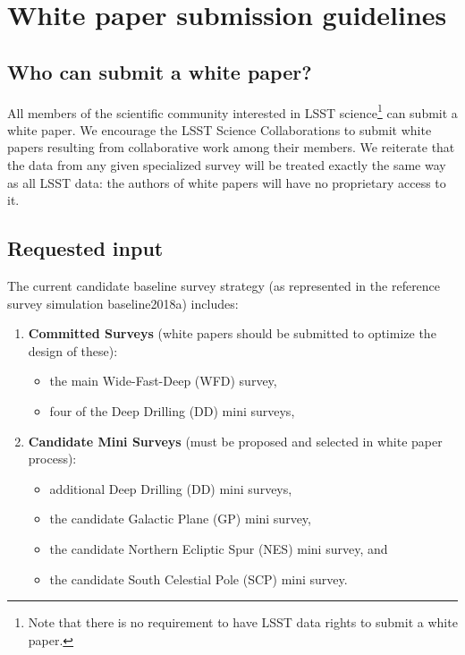\documentclass[DM,toc,usenatbib]{lsstdoc}
\begin{document}
\newpage
\section{White paper submission guidelines} \label{sec:guidelines}


\subsection{Who can submit a white paper?} 

All members of the scientific community interested in LSST science\footnote{Note that there is no 
requirement to have LSST data rights to submit a white paper.} can submit a white paper.
We encourage the LSST Science Collaborations to submit white papers resulting from collaborative
work among their members.
We reiterate that the data from any given specialized survey will be treated exactly the same 
way as all LSST data: the authors of white papers will have no proprietary access to it. 

\subsection{Requested input \label{sec:reqinput}}

The current candidate baseline survey strategy (as represented in the reference survey simulation baseline2018a) 
includes:
\begin{enumerate}
\item {\bf Committed Surveys} (white papers should be submitted to optimize the design of these):
\begin{itemize}
\item the main Wide-Fast-Deep (WFD) survey,
\item four of the Deep Drilling (DD) mini surveys,
\end{itemize}
\item {\bf Candidate Mini Surveys} (must be proposed and selected in white paper process):
\begin{itemize}
\item additional Deep Drilling (DD) mini surveys,
\item the candidate Galactic Plane (GP) mini survey,
\item the candidate Northern Ecliptic Spur (NES) mini survey, and
\item the candidate South Celestial Pole (SCP) mini survey. 
\end{itemize}
\end{enumerate}
\end{document}
